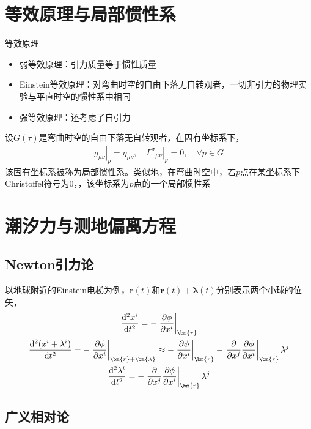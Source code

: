 \section{等效原理与局部惯性系}

等效原理
\begin{itemize}
    \item 弱等效原理：引力质量等于惯性质量
    \item Einstein等效原理：对弯曲时空的自由下落无自转观者，一切非引力的物理实验与平直时空的惯性系中相同\\
    \item 强等效原理：还考虑了自引力
\end{itemize}

设$G(\tau)$是弯曲时空的自由下落无自转观者，在固有坐标系下，
\begin{gather*}
    \left.g_{\mu \nu}\right|_p=\eta_{\mu \nu},\quad \left.{\Gamma^{\sigma}}_{\mu \nu} \right|_p=0,\quad \forall p \in G
\end{gather*}
该固有坐标系被称为局部惯性系。类似地，在弯曲时空中，若$p$点在某坐标系下Christoffel符号为$0$，，该坐标系为$p$点的一个局部惯性系

\section{潮汐力与测地偏离方程}

\subsection{Newton引力论}

以地球附近的Einstein电梯为例，$\bm{r}(t)$和$\bm{r}(t)+\bm{\lambda}(t)$分别表示两个小球的位矢，
\begin{gather*}
    \dt{^2 x^i}{t^2}=-\left.\pt{\phi}{x^i}\right|_{\bm{r}}
    \\
    \dt{^2 (x^i+\lambda^i)}{t^2}=-\left.\pt{\phi}{x^i}\right|_{\bm{r}+\bm{\lambda}} \approx -\left.\pt{\phi}{x^i}\right|_{\bm{r}}-\left.\pt{}{x^j}\pt{\phi}{x^i}\right|_{\bm{r}} \lambda^j
    \\
    \dt{^2 \lambda^i}{t^2}=-\left.\pt{}{x^j}\pt{\phi}{x^i}\right|_{\bm{r}} \lambda^j
\end{gather*}

\subsection{广义相对论}

